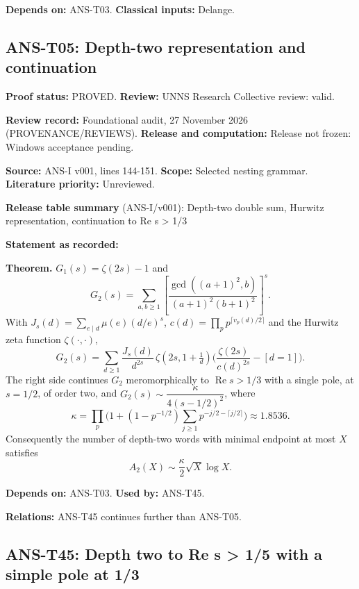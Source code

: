\documentclass[
  11pt,
]{article}
\begin{document}
\textbf{Depends on:} ANS-T03. \textbf{Classical inputs:} Delange.

\hypertarget{ans-t05-depth-two-representation-and-continuation}{%
\subsection{ANS-T05: Depth-two representation and
continuation}\label{ans-t05-depth-two-representation-and-continuation}}

\textbf{Proof status:} PROVED. \textbf{Review:} UNNS Research Collective
review: valid.

\textbf{Review record:} Foundational audit, 27 November 2026
(PROVENANCE/REVIEWS). \textbf{Release and computation:} Release not
frozen: Windows acceptance pending.

\textbf{Source:} ANS-I v001, lines 144-151. \textbf{Scope:} Selected
nesting grammar. \textbf{Literature priority:} Unreviewed.

\textbf{Release table summary} (ANS-I/v001): Depth-two double sum,
Hurwitz representation, continuation to Re s \textgreater{} 1/3

\textbf{Statement as recorded:}

\textbf{Theorem.} \(G_1(s)=\zeta(2s)-1\) and
\[G_2(s)=\sum_{a,b\ge1}\left[\frac{\gcd((a+1)^2,b)}{(a+1)^2(b+1)^2}\right]^{s}.\]
With \(J_s(d)=\sum_{e\mid d}\mu(e)(d/e)^s\),
\(c(d)=\prod_pp^{\lceil v_p(d)/2\rceil}\) and the Hurwitz zeta function
\(\zeta(\cdot,\cdot)\),
\[G_2(s)=\sum_{d\ge1}\frac{J_s(d)}{d^{2s}}\,\zeta\!\left(2s,1+\tfrac1d\right)\Big(\frac{\zeta(2s)}{c(d)^{2s}}-[d=1]\Big).\]
The right side continues \(G_2\) meromorphically to
\(\operatorname{Re}s>1/3\) with a single pole, at \(s=1/2\), of order
two, and \(G_2(s)\sim\dfrac{\kappa}{4(s-1/2)^2}\), where
\[\kappa=\prod_p\Big(1+(1-p^{-1/2})\sum_{j\ge1}p^{-j/2-\lceil j/2\rceil}\Big)\approx1.8536 .\]
Consequently the number of depth-two words with minimal endpoint at most
\(X\) satisfies \[A_2(X)\sim\frac{\kappa}{2}\sqrt X\log X .\]

\textbf{Depends on:} ANS-T03. \textbf{Used by:} ANS-T45.

\textbf{Relations:} ANS-T45 continues further than ANS-T05.

\hypertarget{ans-t45-depth-two-to-re-s-15-with-a-simple-pole-at-13}{%
\subsection{ANS-T45: Depth two to Re s \textgreater{} 1/5 with a simple
pole at
1/3}\label{ans-t45-depth-two-to-re-s-15-with-a-simple-pole-at-13}}
\end{document}
